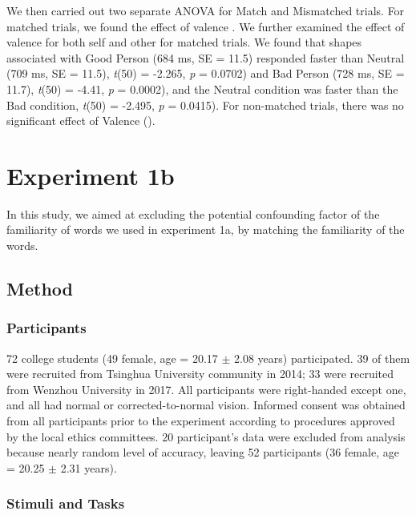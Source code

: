 \documentclass[
  english,
  man]{apa6}
\begin{document}
We then carried out two separate ANOVA for Match and Mismatched trials. For matched trials, we found the effect of valence . We further examined the effect of valence for both self and other for matched trials. We found that shapes associated with Good Person (684 ms, SE = 11.5) responded faster than Neutral (709 ms, SE = 11.5), \emph{t}(50) = -2.265, \emph{p} = 0.0702) and Bad Person (728 ms, SE = 11.7), \emph{t}(50) = -4.41, \emph{p} = 0.0002), and the Neutral condition was faster than the Bad condition, \emph{t}(50) = -2.495, \emph{p} = 0.0415). For non-matched trials, there was no significant effect of Valence ().

\hypertarget{experiment-1b}{%
\section{Experiment 1b}\label{experiment-1b}}

In this study, we aimed at excluding the potential confounding factor of the familiarity of words we used in experiment 1a, by matching the familiarity of the words.

\hypertarget{method}{%
\subsection{Method}\label{method}}

\hypertarget{participants-1}{%
\subsubsection{Participants}\label{participants-1}}

72 college students (49 female, age = 20.17 \(\pm\) 2.08 years) participated. 39 of them were recruited from Tsinghua University community in 2014; 33 were recruited from Wenzhou University in 2017. All participants were right-handed except one, and all had normal or corrected-to-normal vision. Informed consent was obtained from all participants prior to the experiment according to procedures approved by the local ethics committees. 20 participant's data were excluded from analysis because nearly random level of accuracy, leaving 52 participants (36 female, age = 20.25 \(\pm\) 2.31 years).

\hypertarget{stimuli-and-tasks-1}{%
\subsubsection{Stimuli and Tasks}\label{stimuli-and-tasks-1}}
\end{document}
